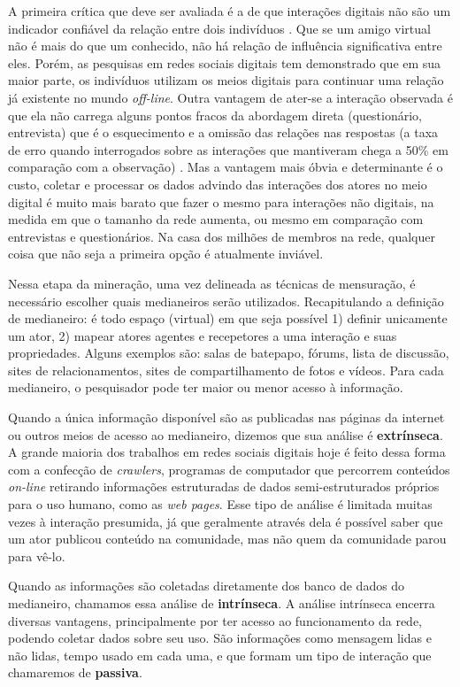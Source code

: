 \documentclass{article}
\begin{document}
A primeira crítica que deve ser avaliada é a de que interações digitais
não são um indicador confiável da relação entre dois indivíduos
\cite{Clemons2007}. Que se um amigo virtual não é mais do que um conhecido, não
há relação de influência significativa entre eles. Porém, as pesquisas em redes
sociais digitais tem demonstrado que em sua maior parte, os indivíduos utilizam
os meios digitais para continuar uma relação já existente no mundo
\textit{off-line}\cite{Haythornthwaite2005}\cite{Recuero2008}. Outra vantagem de
ater-se a interação observada é que ela não carrega alguns pontos fracos da
abordagem direta (questionário, entrevista) que é o esquecimento e a omissão das
relações nas respostas (a taxa de erro quando interrogados sobre as interações
que mantiveram chega a 50\% em comparação com a observação) \cite{Mislove2007}.
Mas a vantagem mais óbvia e determinante é o custo, coletar e processar os dados
advindo das interações dos atores no meio digital é muito mais barato que fazer
o mesmo para interações não digitais, na medida em que o tamanho da rede
aumenta, ou mesmo em comparação com entrevistas e questionários. Na casa dos
milhões de membros na rede, qualquer coisa que não seja a primeira opção é
atualmente inviável.

Nessa etapa da mineração, uma vez delineada as técnicas de mensuração, é
necessário escolher quais medianeiros serão utilizados. Recapitulando a definição
de medianeiro: é todo espaço (virtual) em que seja possível 1) definir unicamente
um ator, 2) mapear atores agentes e recepetores a uma interação e suas
propriedades. Alguns exemplos são: salas de batepapo, fórums, lista de discussão,
sites de relacionamentos, sites de compartilhamento de fotos e vídeos. Para cada
medianeiro, o pesquisador pode ter maior ou menor acesso à informação.

Quando a única informação disponível são as publicadas nas páginas da internet
ou outros meios de acesso ao medianeiro, dizemos que sua análise é
\textbf{extrínseca}. A grande maioria dos trabalhos em redes sociais digitais
hoje é feito dessa forma com a confecção de \textit{crawlers}, programas de
computador que percorrem conteúdos \textit{on-line} retirando informações
estruturadas de dados semi-estruturados próprios para o uso humano, como as
\textit{web pages}. Esse tipo de análise é limitada muitas vezes à interação
presumida, já que geralmente através dela é possível saber que um ator publicou
conteúdo na comunidade, mas não quem da comunidade parou para vê-lo.

Quando as informações são coletadas diretamente dos banco de dados do
medianeiro, chamamos essa análise de \textbf{intrínseca}. A análise intrínseca
encerra diversas vantagens, principalmente por ter acesso ao funcionamento da
rede, podendo coletar dados sobre seu uso. São informações como mensagem lidas e
não lidas, tempo usado em cada uma, e que formam um tipo de interação que
chamaremos de \textbf{passiva}.
\end{document}
